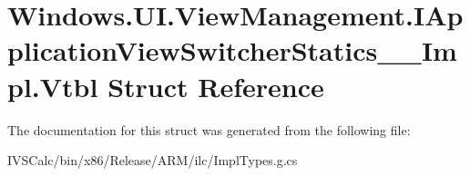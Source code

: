 \hypertarget{struct_windows_1_1_u_i_1_1_view_management_1_1_i_application_view_switcher_statics_____impl_1_1_vtbl}{}\section{Windows.\+U\+I.\+View\+Management.\+I\+Application\+View\+Switcher\+Statics\+\_\+\+\_\+\+Impl.\+Vtbl Struct Reference}
\label{struct_windows_1_1_u_i_1_1_view_management_1_1_i_application_view_switcher_statics_____impl_1_1_vtbl}


The documentation for this struct was generated from the following file\+:\begin{DoxyCompactItemize}
\item 
I\+V\+S\+Calc/bin/x86/\+Release/\+A\+R\+M/ilc/Impl\+Types.\+g.\+cs\end{DoxyCompactItemize}
